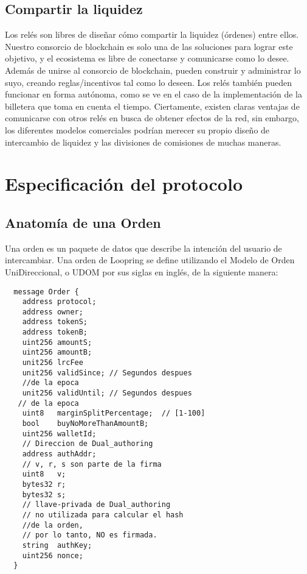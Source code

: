 \documentclass[UTF8,nofonts]{article}
\begin{document}
\begin{multicols}{2}
\subsection{Compartir la liquidez\label{sec:liquidity_sharing}}
Los rel\'es son libres de dise\~nar c\'omo compartir la liquidez (\'ordenes) entre ellos. Nuestro consorcio de blockchain es solo una de las soluciones para lograr este objetivo, y el ecosistema es libre de conectarse y comunicarse como lo desee. Adem\'as de unirse al consorcio de blockchain, pueden construir y administrar lo suyo, creando reglas/incentivos tal como lo deseen. Los rel\'es tambi\'en pueden funcionar en forma aut\'onoma, como se ve en el caso de la implementaci\'on de la billetera que toma en cuenta el tiempo. Ciertamente, existen claras ventajas de comunicarse con otros rel\'es en busca de obtener efectos de la red, sin embargo, los diferentes modelos comerciales podr\'ian merecer su propio dise\~no de intercambio de liquidez y las divisiones de comisiones de muchas maneras.

\section{Especificaci\'on del protocolo\label{sec:protocol}}

\subsection{Anatom\'ia de una Orden\label{anatomy}}
Una orden es un paquete de datos que describe la intenci\'on del usuario de intercambiar. Una orden de Loopring se define utilizando el Modelo de Orden UniDireccional, o UDOM por sus siglas en ingl\'es, de la siguiente manera:

\begin{verbatim}
  message Order {
    address protocol;
    address owner;
    address tokenS;
    address tokenB;
    uint256 amountS;
    uint256 amountB;
    unit256 lrcFee
    unit256 validSince; // Segundos despues 
    //de la epoca
    unit256 validUntil; // Segundos despues
   // de la epoca
    uint8   marginSplitPercentage;  // [1-100]
    bool    buyNoMoreThanAmountB;
    uint256 walletId;
    // Direccion de Dual_authoring
    address authAddr;
   	// v, r, s son parte de la firma
    uint8   v;       
    bytes32 r;
    bytes32 s;
    // llave-privada de Dual_authoring
    // no utilizada para calcular el hash 
    //de la orden,
    // por lo tanto, NO es firmada.
    string  authKey;          
    uint256 nonce;
  }
\end{verbatim}


\end{multicols}
\end{document}
